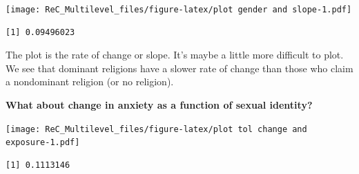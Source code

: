 \documentclass[
  11pt,
]{book}
\newenvironment{Shaded}{\begin{snugshade}}{\end{snugshade}}
\newcommand{\AttributeTok}[1]{\textcolor[rgb]{0.77,0.63,0.00}{#1}}
\newcommand{\FunctionTok}[1]{\textcolor[rgb]{0.00,0.00,0.00}{#1}}
\newcommand{\NormalTok}[1]{#1}
\newcommand{\SpecialCharTok}[1]{\textcolor[rgb]{0.00,0.00,0.00}{#1}}
\newcommand{\StringTok}[1]{\textcolor[rgb]{0.31,0.60,0.02}{#1}}
\begin{document}
\begin{Shaded}
\end{Shaded}

\texttt{[image: ReC\_Multilevel\_files/figure-latex/plot gender and slope-1.pdf]}

\begin{Shaded}
\end{Shaded}

\begin{verbatim}
[1] 0.09496023
\end{verbatim}

The plot is the rate of change or slope. It's maybe a little more difficult to plot. We see that dominant religions have a slower rate of change than those who claim a nondominant religion (or no religion).

\textbf{What about change in anxiety as a function of sexual identity?}

\begin{Shaded}
\end{Shaded}

\texttt{[image: ReC\_Multilevel\_files/figure-latex/plot tol change and exposure-1.pdf]}

\begin{Shaded}
\end{Shaded}

\begin{verbatim}
[1] 0.1113146
\end{verbatim}
\end{document}
